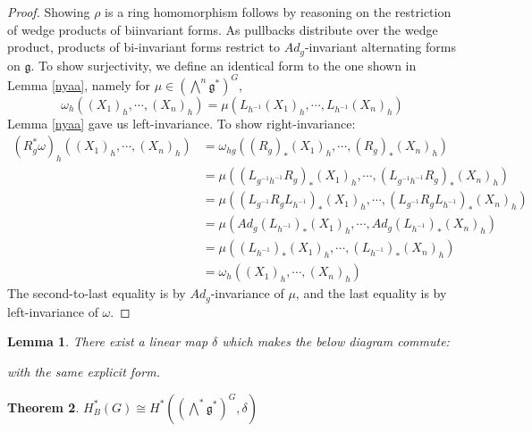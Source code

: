 \documentclass[12pt]{amsart}
\newtheorem{theorem}{Theorem}[section]
\newtheorem{lemma}[theorem]{Lemma}
\numberwithin{equation}{section}
\begin{document}
\begin{proof}
Showing $\rho$ is a ring homomorphism follows by reasoning on the restriction of wedge products of biinvariant forms. As pullbacks distribute over the wedge product, products of bi-invariant forms restrict to $Ad_g$-invariant alternating forms on $\mathfrak{g}$. To show surjectivity, we define an identical form to the one shown in Lemma \ref{nyaa}, namely for $\mu \in \left( \bigwedge^n\mathfrak{g}^* \right)^G$,
$$ \omega_h((X_1)_h,\cdots,(X_n)_h) = \mu(L_{h^{-1}}(X_1)_h,\cdots, L_{h^{-1}}(X_n)_h)$$
Lemma \ref{nyaa} gave us left-invariance. To show right-invariance:
\begin{align*}
  (R^*_g\omega)_h((X_1)_h,\cdots,(X_n)_h)
  & = \omega_{hg}((R_{g})_*(X_1)_h, \cdots, (R_{g})_*(X_n)_h) \\
  & = \mu((L_{g^{-1}h^{-1}}R_{g})_*(X_1)_h, \cdots, (L_{g^{-1}h^{-1}}R_{g})_*(X_n)_h) \\
  & = \mu((L_{g^{-1}}R_{g}L_{h^{-1}})_*(X_1)_h, \cdots, (L_{g^{-1}}R_{g}L_{h^{-1}})_*(X_n)_h) \\
  & = \mu(Ad_g(L_{h^{-1}})_*(X_1)_h, \cdots, Ad_g(L_{h^{-1}})_*(X_n)_h) \\
  & = \mu((L_{h^{-1}})_*(X_1)_h, \cdots, (L_{h^{-1}})_*(X_n)_h) \\
  & = \omega_h((X_1)_h, \cdots, (X_n)_h)
\end{align*}
The second-to-last equality is by $Ad_g$-invariance of $\mu$, and the last equality is by left-invariance of $\omega$.
\end{proof}
%
\begin{lemma}
There exist a linear map $\delta$ which makes the below diagram commute:
\begin{figure}[h!]
  \centering
\end{figure}

with the same explicit form.
\end{lemma}
%
\begin{theorem}
  $H^*_B(G) \cong H^*(\left( \bigwedge^*\mathfrak{g}^* \right)^G,\delta)$
\end{theorem}



\end{document}
